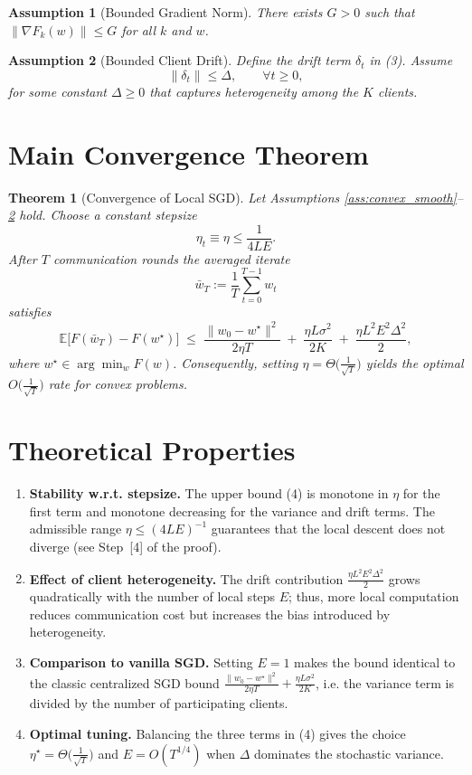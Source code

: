 \documentclass[11pt]{article}
\newtheorem{theorem}{Theorem}
\newtheorem{assumption}{Assumption}
\newcommand{\E}{\mathbb{E}}
\begin{document}
\begin{assumption}[Bounded Gradient Norm]\label{ass:gradbound}
There exists $G>0$ such that $\|\nabla F_k(w)\|\le G$ for all $k$ and $w$.
\end{assumption}

\begin{assumption}[Bounded Client Drift]\label{ass:drift}
Define the drift term $\delta_t$ in (3).  Assume
\[
\|\delta_t\|\le \Delta,\qquad\forall t\ge0,
\]
for some constant $\Delta\ge0$ that captures heterogeneity among the $K$ clients.
\end{assumption}

\section*{Main Convergence Theorem}
\begin{theorem}[Convergence of Local SGD]\label{thm:convergence}
Let Assumptions \ref{ass:convex_smooth}–\ref{ass:drift} hold.  Choose a constant stepsize
\[
\eta_t\equiv \eta\le\frac{1}{4L E}.
\]
After $T$ communication rounds the averaged iterate
\[
\bar w_T:=\frac1T\sum_{t=0}^{T-1} w_t
\]
satisfies
\[
\E\!\big[F(\bar w_T)-F(w^\star)\big]
\;\le\;
\frac{\|w_0-w^\star\|^2}{2\eta T}
\;+\;
\frac{\eta L\sigma^2}{2K}
\;+\;
\frac{\eta L^2E^2\Delta^2}{2},
\tag{4}
\]
where $w^\star\in\arg\min_w F(w)$.
Consequently, setting $\eta =\Theta\!\big(\tfrac{1}{\sqrt{T}}\big)$ yields the optimal $O\!\big(\tfrac{1}{\sqrt{T}}\big)$ rate for convex problems.
\end{theorem}

\section*{Theoretical Properties}
\begin{enumerate}[label=\arabic*)]
\item \textbf{Stability w.r.t. stepsize.}  The upper bound (4) is monotone in $\eta$ for the first term and monotone decreasing for the variance and drift terms.  The admissible range $\eta\le (4LE)^{-1}$ guarantees that the local descent does not diverge (see Step~[4] of the proof).
\item \textbf{Effect of client heterogeneity.}  The drift contribution $\frac{\eta L^2E^2\Delta^2}{2}$ grows quadratically with the number of local steps $E$; thus, more local computation reduces communication cost but increases the bias introduced by heterogeneity.
\item \textbf{Comparison to vanilla SGD.}  Setting $E=1$ makes the bound identical to the classic centralized SGD bound $\frac{\|w_0-w^\star\|^2}{2\eta T}+\frac{\eta L\sigma^2}{2K}$, i.e. the variance term is divided by the number of participating clients.
\item \textbf{Optimal tuning.}  Balancing the three terms in (4) gives the choice $\eta^\star = \Theta\!\big(\frac{1}{\sqrt{T}}\big)$ and $E = O(T^{1/4})$ when $\Delta$ dominates the stochastic variance.
\end{enumerate}
\end{document}
